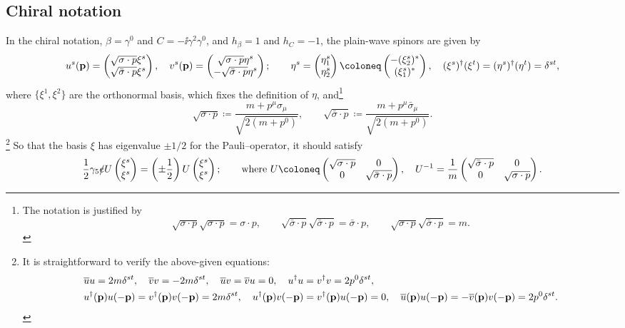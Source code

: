 \documentclass{CheatSheet}
\begin{document}
\subsection{Chiral notation}
In the chiral notation, $\beta=\gamma^0$ and $C=-\ii\gamma^2\gamma^0$, and $h_\beta=1$ and $h_C=-1$, the plain-wave spinors are given by
\begin{equation}
 u^s(\vc p) = \pmat{\sqrt{\sigma\cdot p}\xi^s\\\sqrt{\bar\sigma\cdot p}\xi^s},\quad
 v^s(\vc p) = \pmat{\sqrt{\sigma\cdot p}\eta^s\\-\sqrt{\bar\sigma\cdot p}\eta^s};\qquad
 \eta^s = \pmat{\eta^s_1\\\eta^s_2} \coloneq  \pmat{-(\xi^s_2)^*\\(\xi^s_1)^*},\quad
(\xi^s)^\dagger(\xi^t) = (\eta^s)^\dagger(\eta^t) = \delta^{st},
\end{equation}
where $\{\xi^1,\xi^2\}$ are the orthonormal basis, which fixes the definition of $\eta$, and\footnote{%
The notation is justified by
\begin{equation*}
\sqrt{\sigma\cdot p}\sqrt{\sigma\cdot p} ={\sigma\cdot p},\qquad
\sqrt{\bar\sigma\cdot p}\sqrt{\bar\sigma\cdot p} ={\bar\sigma\cdot p},\qquad
\sqrt{\sigma\cdot p}\sqrt{\bar\sigma\cdot p}=m.
\end{equation*}}
\begin{equation}
  \sqrt{\sigma\cdot p} \coloneq  \frac{m+p^\mu\sigma_\mu}{\sqrt{2(m+p^0)}},
\qquad
 \sqrt{\bar\sigma\cdot p} \coloneq  \frac{m+p^\mu\bar\sigma_\mu}{\sqrt{2(m+p^0)}}.
\end{equation}
\footnote{It is straightforward to verify the above-given equations:
\begin{align}
&
 \overline u u = 2m\delta^{st},\quad
 \overline v v = -2m\delta^{st},\quad
 \overline u v = \overline v u = 0,\quad
 u^\dagger u = v^\dagger v = 2p^0\delta^{st},\quad
\\&
 u^\dagger({\mathbf{p}})u(-{\mathbf{p}})= v^\dagger({\mathbf{p}})v(-{\mathbf{p}})=2m\delta^{st},\quad
 u^\dagger({\mathbf{p}})v(-{\mathbf{p}})= v^\dagger({\mathbf{p}})u(-{\mathbf{p}})=0,\quad
 \overline u({\mathbf{p}})u(-{\mathbf{p}})= -\overline v({\mathbf{p}})v(-{\mathbf{p}})=2p^0\delta^{st}.
\end{align}
}
So that the basis $\xi$ has eigenvalue $\pm1/2$ for the Pauli--\Lubanski operator, it should satisfy
\begin{equation}
 \frac12 \gamma_5\slashed{e} U \pmat{\xi^s\\\xi^s} = \left(\pm\frac12\right)U\pmat{\xi^s\\\xi^s};\qquad
\text{where~}
 U\coloneq \pmat{\sqrt{\sigma\cdot p} & 0 \\ 0 & \sqrt{\bar\sigma\cdot p}},\quad
 U^{-1}=\frac{1}{m}\pmat{\sqrt{\bar\sigma\cdot p} & 0 \\ 0 & \sqrt{\sigma\cdot p}}.
\end{equation}
\end{document}
